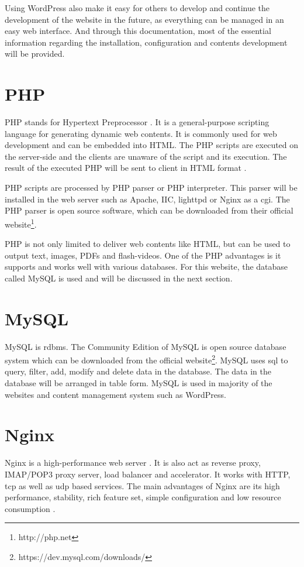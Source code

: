 Using WordPress also make it easy for others to develop and continue the development of the website in the future, as everything can be managed in an easy web interface. And through this documentation, most of the essential information regarding the installation, configuration and contents development will be provided.

\section{PHP}
PHP stands for Hypertext Preprocessor \cite{PHPGroup.2001}. It is a general-purpose scripting language for generating dynamic web contents. It is commonly used for web development and can be embedded into HTML. The PHP scripts are executed on the server-side and the clients are unaware of the script and its execution. The result of the executed PHP will be sent to client in HTML format \cite{PHPGroup.2001b}.

PHP scripts are processed by PHP parser or PHP interpreter. This parser will be installed in the web server such as Apache, IIC, lighttpd or Nginx as a \ac{cgi}. The PHP parser is open source software, which can be downloaded from their official website\footnote{http://php.net}.

PHP is not only limited to deliver web contents like HTML, but can be used to output text, images, PDFs and flash-videos. One of the PHP advantages is it supports and works well with various databases. For this website, the database called MySQL is used and will be discussed in the next section.

\section{MySQL}
MySQL is \ac{rdbms}. The Community Edition of MySQL is open source database system which can be downloaded from the official website\footnote{https://dev.mysql.com/downloads/}. MySQL uses \ac{sql} \cite{RefsnesData.2017} to query, filter, add, modify and delete data in the database. The data in the database will be arranged in table form. MySQL is used in majority of the websites and content management system such as WordPress.

\section{Nginx}
Nginx is a high-performance web server \cite{NGINXInc..2009}. It is also act as reverse proxy, IMAP/POP3 proxy server, load balancer and accelerator. It works with HTTP, \ac{tcp} as well as \ac{udp} based services. The main advantages of Nginx are its high performance, stability, rich feature set, simple configuration and low resource consumption \cite{NGINXInc..2017}.

